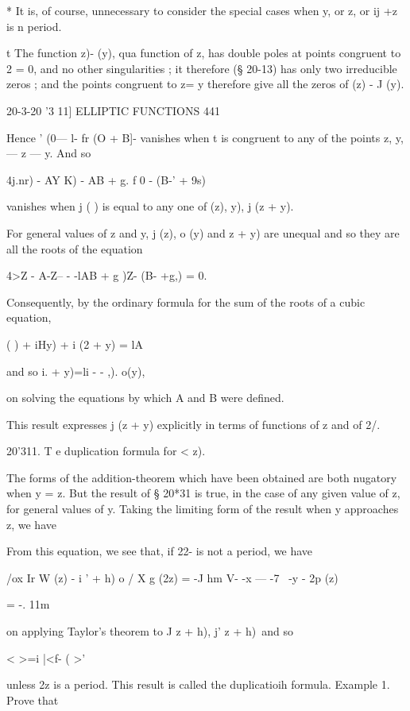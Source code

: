 {* It is, of course, unnecessary to consider the special cases when y,
or z, or ij +z is n period.

t The function z)- (y), qua function of z, has double poles at points
congruent to 2 = 0, and no other singularities ; it therefore (§
20-13) has only two irreducible zeros ; and the points congruent to z=
y therefore give all the zeros of (z) - J (y).



20-3-20 '3 11] ELLIPTIC FUNCTIONS 441

Hence ' (0— l- fr (O + B]- vanishes when t is congruent to any of the
points z, y, — z — y. And so

4j.nr) - AY K) - AB + g. f 0 - (B-' + 9s)

vanishes when j ( ) is equal to any one of (z), y), j (z + y).

For general values of z and y, j (z), o (y) and z + y) are unequal and
so they are all the roots of the equation

4>Z - A-Z-- - -lAB + g )Z- (B- +g,) = 0.

Consequently, by the ordinary formula for the sum of the roots of a
cubic equation,

 ( ) + iHy) + i (2 + y) = lA%

and so i. + y)=li - - ,). o(y),

on solving the equations by which A and B were defined.

This result expresses j (z + y) explicitly in terms of functions of z
and of 2/.

20'311. T e duplication formula for < z).

The forms of the addition-theorem which have been obtained are both
nugatory when y = z. But the result of § 20*31 is true, in the case of
any given value of z, for general values of y. Taking the limiting
form of the result when y approaches z, we have

From this equation, we see that, if 22- is not a period, we have

/ox Ir W (z) - i ' + h) o / X g (2z) = -J hm V- -x — -7 ~-y - 2p (z)



= -. 11m



on applying Taylor's theorem to J z + h), j' z + h)\ and so



 < >=i |<f- ( >'



unless 2z is a period. This result is called the duplicatioih formula.
Example 1. Prove that

}
